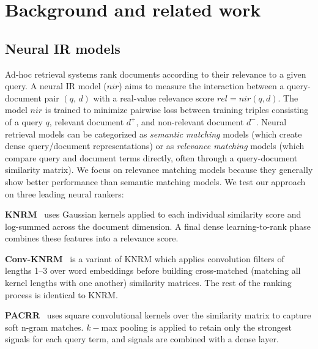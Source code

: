 \section{Background and related work}
\label{sec.background}
\subsection{Neural IR models}\label{sec.background.nir}
Ad-hoc retrieval systems rank documents according to their
relevance to a given query.
A neural IR model
($\mathit{nir}$) aims to measure the interaction between a query-document pair $(q,
\,d)$ with a real-value relevance score $rel=\mathit{nir}(q,d)$. The model $nir$ is trained to minimize pairwise loss between training triples consisting of a query $q$, relevant document $d^+$, and non-relevant document $d^-$.
Neural retrieval models can be categorized as \emph{semantic matching} models (which create dense query/document representations) or as \emph{relevance matching} models (which compare query and document terms directly, often through a query-document similarity matrix). We focus on relevance matching models because they generally show better performance than semantic matching models.
We test our approach on three leading neural rankers:


\textbf{KNRM}~\cite{xiong2017end} uses Gaussian kernels applied to each individual similarity score and log-summed across the document dimension. A final dense learning-to-rank phase combines these features into a relevance score.

\textbf{Conv-KNRM}~\cite{convknrm} is a variant of KNRM which applies convolution filters of lengths 1--3 over word embeddings before building cross-matched (matching all kernel lengths with one another) similarity matrices. The rest of the ranking process is identical to KNRM.

\textbf{PACRR}~\cite{hui2017pacrr}
uses square convolutional kernels over the similarity matrix to capture soft n-gram matches. $k-$max pooling is applied to retain only the strongest signals for each query term, and signals are combined with a dense layer.


